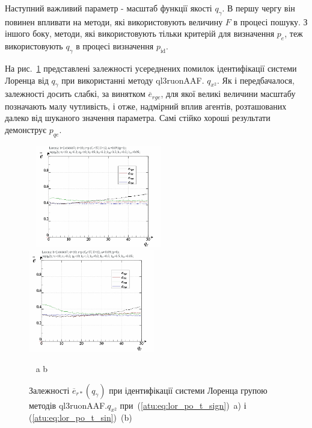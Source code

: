 Наступний важливий параметр - масштаб функції якості
$ q_\gamma $. В першу чергу він повинен впливати на методи, які
використовують величину
$ F $ в процесі пошуку. З іншого боку, методи, які використовують
тільки критерій для визначення
$ p_e $, теж використовують
$ q_\gamma $ в процесі визначення
$ p_\mathrm{id} $.

На рис.~\ref{atu:f:lor_qg_ql3ruonAAF.q_x2} представлені залежності усереднених
помилок ідентифікації системи Лоренца від
$ q_\gamma $ при використанні методу ql3ruonAAF.
$ q_{x^2} $. Як і передбачалося, залежності досить слабкі, за винятком
$ \overline{e}_{rge} $, для якої великі величини масштабу позначають малу
чутливість, і отже, надмірний вплив агентів, розташованих далеко
від шуканого значення параметра. Самі стійко хороші результати
демонструє
$ p_{qe} $.

\begin{figure}[ht!]
  \begin{center}
    ~ \hfill
    \includegraphics[width=0.49\textwidth]{p/cha/lor/ql3ruonAAF/lor_ql3ruonAAF_qx2-p_qgamma_e_sign.png}
    \hfill
    \includegraphics[width=0.49\textwidth]{p/cha/lor/ql3ruonAAF/lor_ql3ruonAAF_qx2-p_qgamma_e_sin.png}
    \hfill ~
  \end{center}
  \vspace{-1.0ex}
  \begin{center}
    ~ \hfill a \hfill\hfill b \hfill ~
  \end{center}
  \vspace{-1.5ex}
  \caption{Залежності $\overline{e}_{r *} (q_\gamma) $ при ідентифікації системи Лоренца групою методів ql3ruonAAF.$q_{x^2} $ при~(\ref{atu:eq:lor_po_t_sign})~a) і (\ref{atu:eq:lor_po_t_sin})~(b)}
\label{atu:f:lor_qg_ql3ruonAAF.q_x2}
\end{figure}



